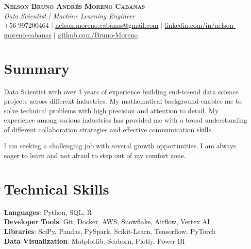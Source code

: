 \documentclass[letterpaper,11pt]{article}
\begin{document}

\begin{center}
    \textbf{\Huge \scshape Nelson Bruno Andrés Moreno Cabañas} \\ \vspace{3pt}
    \large \textit{Data Scientist | Machine Learning Engineer} \\ \vspace{3pt}
    \small +56 997200464 $|$ \href{mailto:nelson.moreno.cabanas@gmail.com}{\underline{nelson.moreno.cabanas@gmail.com}} $|$ 
    \href{https://linkedin.com/in/nelson-moreno-cabanas/}{\underline{linkedin.com/in/nelson-moreno-cabanas}} $|$
    \href{https://github.com/Bruno-Moreno}{\underline{github.com/Bruno-Moreno}}
\end{center}

\section*{Summary}
Data Scientist with over 3 years of experience building end-to-end data science projects across different industries. My mathematical background enables me to solve technical problems with high precision and attention to detail. My experience among various industries has provided me with a broad understanding of different collaboration strategies and effective communication skills. 

\vspace{0.3cm}

I am seeking a challenging job with several growth opportunities. I am always eager to learn and not afraid to step out of my comfort zone.

\section{Technical Skills}
 \begin{itemize}[leftmargin=0.15in, label={}]
    \small{\item{
     \textbf{Languages}{: Python, SQL, R} \\
     \textbf{Developer Tools}{: Git, Docker, AWS, Snowflake, Airflow, Vertex AI} \\
     \textbf{Libraries}{: SciPy, Pandas, PySpark, Scikit-Learn, Tensorflow, PyTorch} \\
     \textbf{Data Visualization}{: Matplotlib, Seaborn, Plotly, Power BI} \\
    }}
 \end{itemize}
\end{document}
